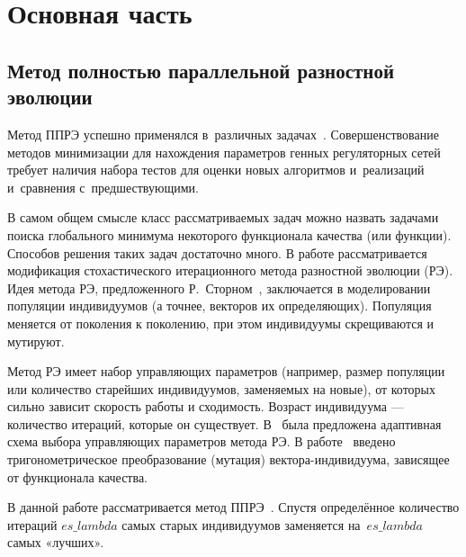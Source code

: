 \chapter*{Основная часть} %

\section{Метод полностью параллельной разностной эволюции} \label{s1}

Метод ППРЭ успешно применялся в~различных задачах~\cite{bib3,bib4}.
Совершенствование методов минимизации для нахождения параметров генных 
регуляторных сетей требует наличия набора тестов для оценки новых алгоритмов 
и~реализаций и~сравнения с~предшествующими. 

В самом общем смысле класс рассматриваемых задач можно назвать задачами 
поиска глобального минимума некоторого функционала качества (или функции). 
Способов решения таких задач достаточно много. В работе рассматривается 
модификация стохастического итерационного метода разностной эволюции (РЭ). 
Идея метода РЭ, предложенного Р.~Сторном~\cite{bib1}, заключается в 
моделировании популяции индивидуумов (а точнее, векторов их определяющих). 
Популяция меняется от поколения к поколению, при этом индивидуумы скрещиваются 
и мутируют. 

Метод РЭ имеет набор управляющих параметров (например, размер популяции 
или количество старейших индивидуумов, заменяемых на новые), от которых сильно 
зависит скорость работы и сходимость. Возраст индивидуума — количество итераций,
которые он существует. В~\cite{bibZaharie} была предложена адаптивная схема 
выбора управляющих параметров метода РЭ. В работе~\cite{bibTM} введено 
тригонометрическое преобразование (мутация) вектора-индивидуума, зависящее от 
функционала качества. 

В данной работе рассматривается метод ППРЭ~\cite{bib2,bib5}. Спустя определённое
количество итераций $es\_lambda$ самых старых индивидуумов заменяется 
на~$es\_lambda$ самых «лучших».

\clearpage
